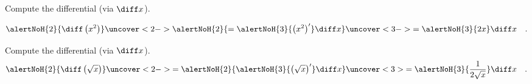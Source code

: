 \begin{frame}
\begin{example}
Compute the differential (via $\diff x$).

\[
\alertNoH{2}{\diff\left(x^2\right)}\uncover<2->{\alertNoH{2}{= \alertNoH{3}{\left(x^2\right)'} \diff x} } \uncover<3->{=\alertNoH{3}{2x} \diff x\quad .}
\]
\end{example}
\end{frame}
\begin{frame}
\begin{example}
Compute the differential (via $\diff x$).
\[
\alertNoH{2}{\diff \left(\sqrt{x}\right)} \uncover<2->{= \alertNoH{2}{\alertNoH{3}{\left(\sqrt{x}\right)'}\diff  x} \uncover<3>{= \alertNoH{3}{ \frac{1}{2\sqrt{x}}} \diff x \quad .}}
\]
\end{example}
\end{frame}

